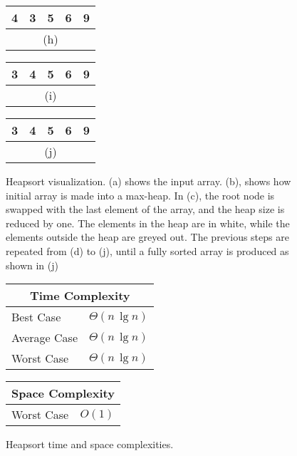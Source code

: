 \begin{figure}[!ht]
\begin{tabular}{|c|c|c|c|c|}
    \hline
    4 & 3 & \cellcolor{lightgray}5 & \cellcolor{lightgray}6 & \cellcolor{lightgray}9 \\
    \hline
    \multicolumn{5}{c}{(h)} \\
    \end{tabular}
    \break
    \begin{tabular}{|c|c|c|c|c|}
    \hline
    3 & \cellcolor{lightgray}4 & \cellcolor{lightgray}5 & \cellcolor{lightgray}6 & \cellcolor{lightgray}9 \\
    \hline
    \multicolumn{5}{c}{(i)} \\
    \end{tabular}
    \quad\quad\quad
    \begin{tabular}{|c|c|c|c|c|}
    \hline
    \cellcolor{lightgray}3 & \cellcolor{lightgray}4 & \cellcolor{lightgray}5 & \cellcolor{lightgray}6 & \cellcolor{lightgray}9 \\
    \hline
    \multicolumn{5}{c}{(j)} \\
    \end{tabular}
    
    \caption{Heapsort visualization. (a) shows the input array. (b),  shows how initial array is made into a max-heap. In (c), the root node is swapped with the last element of the array, and the heap size is reduced by one. The elements in the heap are in white, while the elements outside the heap are greyed out. The previous steps are repeated from (d) to (j), until a fully sorted array is produced as shown in (j)}
    \label{fig:heapsort_ex}
\end{figure}

\begin{figure}[!ht]
    \centering
    \begin{tabular}{l|l}
    \multicolumn{2}{c}{\textbf{Time Complexity}} \\
    \hline
    Best Case    & $\Theta(n \, \lg n)$ \\
    Average Case & $\Theta(n \, \lg n)$ \\
    Worst Case   & $\Theta(n \, \lg n)$ \\
    \end{tabular}
    \quad\quad
    \begin{tabular}{l|l}
    \multicolumn{2}{c}{\textbf{Space Complexity}} \\
    \hline
    Worst Case   & $O(1)$
    \end{tabular}
    
    \caption{Heapsort time\cite{clrs2009} and space complexities\cite{big-o}.}
    \label{fig:heapsort}
\end{figure}

